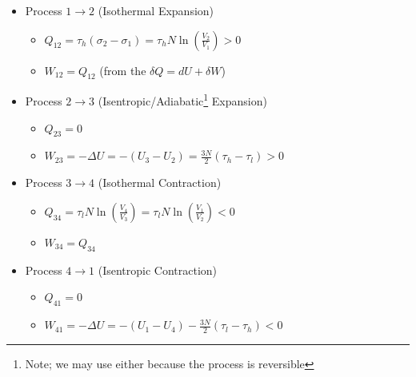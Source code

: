 \begin{itemize}
    \begin{itemize}

      \item Process $1\to2$ (Isothermal Expansion)

        \begin{itemize}

          \item $Q_{12}=\tau_h(\sigma_2-\sigma_1)=\tau_hN\ln\left( \frac{V_2}{V_1} \right)>0$

          \item $W_{12}=Q_{12}$ (from the $\delta Q=dU + \delta W$)

        \end{itemize}

      \item Process $2\to3$ (Isentropic/Adiabatic\footnote{Note; we may use either because the process is reversible} Expansion)

        \begin{itemize}

          \item $Q_{23}=0$

          \item $W_{23}=-\Delta U=-(U_3-U_2)=\frac{3N}{2}(\tau_h-\tau_l) >0$

        \end{itemize}

      \item Process $3\to4$ (Isothermal Contraction)

        \begin{itemize}

          \item $Q_{34}=\tau_lN\ln\left( \frac{V_4}{V_3} \right)=\tau_lN\ln\left( \frac{V_1}{V_2} \right)<0$

          \item $W_{34}=Q_{34}$

        \end{itemize}

      \item Process $4\to1$ (Isentropic Contraction)

        \begin{itemize}

          \item $Q_{41}=0$

          \item $W_{41}=-\Delta U=-\left( U_1-U_4 \right)-\frac{3N}{2}\left( \tau_l-\tau_h \right)<0$


\end{itemize}
\end{itemize}
\end{itemize}
